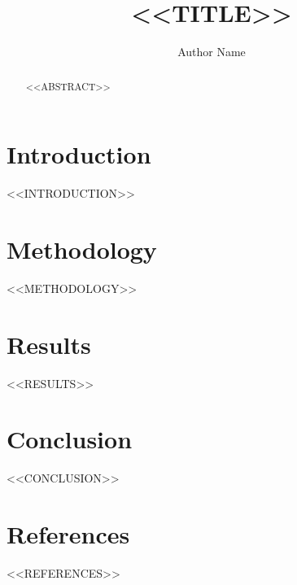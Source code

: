 \documentclass[sigconf]{acmart}
\begin{document}
\title{<<TITLE>>}

\author{Author Name}

\begin{abstract}
<<ABSTRACT>>
\end{abstract}


\maketitle

\section{Introduction}
<<INTRODUCTION>>

\section{Methodology}
<<METHODOLOGY>>

\section{Results}
<<RESULTS>>

\section{Conclusion}
<<CONCLUSION>>

\section*{References}
<<REFERENCES>>
\end{document}
